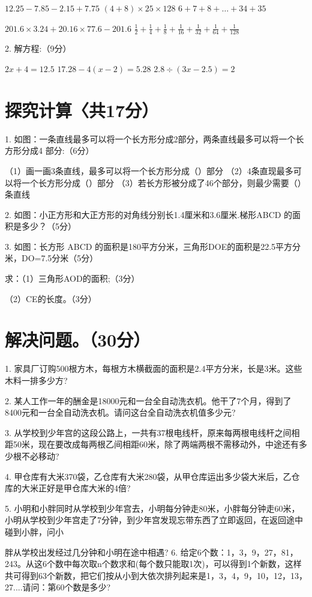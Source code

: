 \documentclass{../source/Paper}
\begin{document}
$12.25 - 7.85 - 2.15 + 7.75$
\hspace{3cm}
$(4+8)\times 25\times 128$
\hspace{3cm}
$6+7+8+…+34+35$

\vspace{3cm}

$201.6\times 3.24+20.16\times 77.6-201.6$
\hspace{5cm}
$\displaystyle \frac{1}{2} + \frac{1}{4} + \frac{1}{8} + \frac{1}{16} + \frac{1}{32} + \frac{1}{64} + \frac{1}{128} $

\vspace{3cm}

2. 解方程:（9分）

$2x+4=12.5$\hspace{3cm}
$17.28 - 4(x-2) = 5.28$\hspace{3cm}
$2.8 \div (3x-2.5)=2$
\vspace{3cm}


\section{探究计算〈共17分）}

1. 如图：一条直线最多可以将一个长方形分成2部分，两条直线最多可以将一个长方形分成4
部分:（6分）

（1）画一画3条直线，最多可以将一个长方形分成（\qquad）部分
（2）4条直现最多可以将一个长方形分成（\qquad）部分
（3）若长方形被分成了46个部分，则最少需要（\qquad）条直线

2. 如图：小正方形和大正方形的对角线分别长1.4厘米和3.6厘米.梯形ABCD 的面积是多少？（5分）

3. 如图：长方形 ABCD 的面积是180平方分米，三角形DOE的面积是22.5平方分米，DO=7.5分米（5分）

求：（1）三角形AOD的面积;（3分）

（2）CE的长度。（3分）

\section{解决问题。（30分）}

1. 家具厂订购500根方木，每根方木横截面的面积是2.4平方分米，长是3米。这些木料一排多少方?

2. 某人工作一年的酬金是18000元和一台全自动洗衣机。他干了7个月，得到了8400元和一台全自动洗衣机。请问这台全自动洗衣机值多少元?

3. 从学校到少年宫的这段公路上，一共有37根电线杆，原来每两根电线杆之间相距50米，现在要改成每两根乙间相距60米，除了两端两根不需移动外，中途还有多少根不必移动?

4. 甲仓库有大米370袋，乙仓库有大米280袋，从甲仓库运出多少袋大米后，乙仓库的大米正好是甲仓库大米的4倍?

5. 小明和小胖同时从学校到少年宫去，小明每分钟走80米，小胖每分钟走60米，小明从学校到少年宫走了7分钟，到少年宫发现忘带东西了立即返回，在返回途中碰到小胖，问小

胖从学校出发经过几分钟和小明在途中相遇?
6. 给定6个数：1，3，9，27，81，243。从这6个数中每次取n个数求和(每个数只能取1次)，可以得到1个新数，这样共可得到63个新数，把它们按从小到大依次排列起来是1，3，4，9，10，12，13，27....请问：第60个数是多少?
\end{document}
